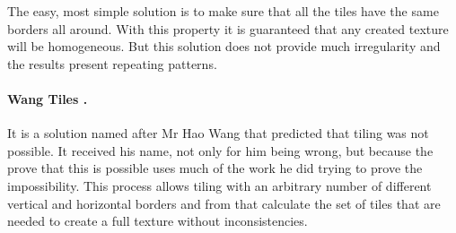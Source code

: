 The easy, most simple solution is to make sure that all the tiles have the same borders all around. With this property it is guaranteed that any created texture will be homogeneous. But this solution does not provide much irregularity and the results present repeating patterns. 


\paragraph{Wang Tiles \cite{Cohen2003}.} %
\label{par:wang_tiles_}

 It is a solution named after Mr Hao Wang that predicted that tiling was not possible. It received his name, not only for him being wrong, but because the prove that this is possible uses much of the work he did trying to prove the impossibility. This process allows tiling with an arbitrary number of different vertical and horizontal borders and from that calculate the set of tiles that are needed to create a full texture without inconsistencies. 



